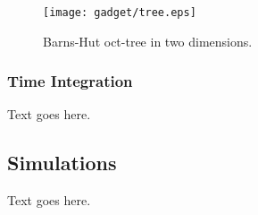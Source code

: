 \begin{figure}[t]
	\centering
	\texttt{[image: gadget/tree.eps]}
	\caption[Barns-Hut oct-tree in two dimensions.]{Barns-Hut oct-tree in two dimensions.}
	\label{fig:gadget--tree}
\end{figure}



\subsubsection{Time Integration}
\label{subsubsec:gadget--gadget--time_integration}


Text goes here.




\subsection{Simulations}
\label{subsec:gadget--simulations}


Text goes here.




